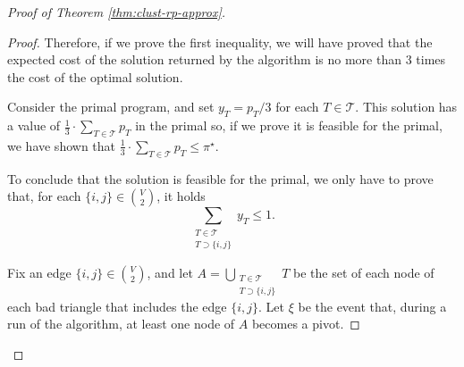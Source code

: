 \begin{proof}[Proof of Theorem \ref{thm:clust-rp-approx}]
\begin{proof}
    \smallskip

    Therefore, if we prove the first inequality, we will have proved that the expected cost of the solution returned by the algorithm is no more than 3 times the cost of the optimal solution.

    \smallskip

    Consider the primal program, and set $y_T = p_T / 3$ for each $T \in \mathcal{T}$. This solution has a value of $\frac13 \cdot \sum_{T \in \mathcal{T}} p_T$ in the primal so, if we prove it is feasible for the primal, we have shown that $\frac13 \cdot \sum_{T \in \mathcal{T}} p_T \le \pi^{\star}$.

    \smallskip

    To conclude that the solution is feasible for the primal, we only have to prove that, for each $\{i,j\} \in \binom V2$, it holds
    $$\sum_{\substack{T \in \mathcal{T}\\T \supset \{i,j\}}} y_T \le 1.$$

    Fix an edge $\{i,j\} \in \binom V2$, and let $A = \bigcup_{\substack{T \in \mathcal{T}\\T \supset \{i,j\}}} T$ be the set of each node of each bad triangle that includes the edge $\{i,j\}$. Let $\xi$ be the event that, during a run of the algorithm, at least one node of $A$ becomes a pivot.


\end{proof}
\end{proof}
